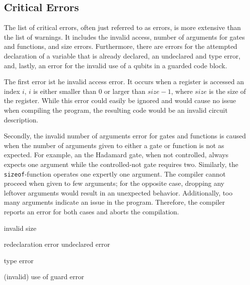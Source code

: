 \subsection{Critical Errors}
The list of critical errors, often just referred to as errors, is more extensive than the list of warnings. It includes the invalid access, number of arguments for gates and functions, and size errors. Furthermore, there are errors for the attempted declaration of a variable that is already declared, an undeclared and type error, and, lastly, an error for the invalid use of a qubits in a guarded code block.

The first error ist he invalid access error. It occurs when a register is accessed an index $i$, \ie $i$ is either smaller than $0$ or larger than $size - 1$, where $size$ is the size of the register. While this error could easily be ignored and would cause no issue when compiling the program, the resulting code would be an invalid circuit description. 

Secondly, the invalid number of arguments error for gates and functions is caused when the number of arguments given to either a gate or function is not as expected. For example, an the Hadamard gate, when not controlled, always expects one argument while the controlled-not gate requires two. Similarly, the \texttt{sizeof}-function operates one expertly one argument. The compiler cannot proceed when given to few arguments; for the opposite case, dropping any leftover arguments would result in an unexpected behavior. Additionally, too many arguments indicate an issue in the program. Therefore, the compiler reports an error for both cases and aborts the compilation.

invalid size

redeclaration error
undeclared error

type error

(invalid) use of guard error 